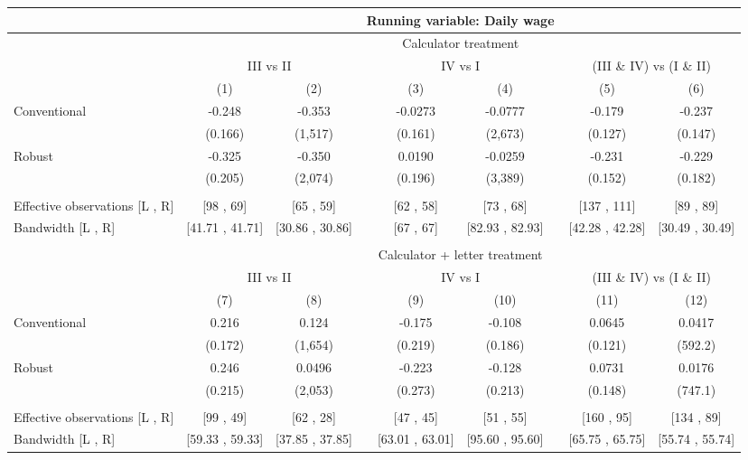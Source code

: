 \begin{tabular}{lcccccccc}
\toprule
      & \multicolumn{8}{c}{Running variable: Daily wage} \\
\midrule
      & \multicolumn{8}{c}{Calculator treatment} \\
\midrule
      & \multicolumn{2}{c}{III vs II} &       & \multicolumn{2}{c}{IV vs I} &       & \multicolumn{2}{c}{(III \& IV) vs (I \& II)} \\
\cmidrule{2-3}\cmidrule{5-6}\cmidrule{8-9}      & (1)   & (2)   &       & (3)   & (4)   &       & (5)   & (6) \\
\midrule
\midrule
Conventional & -0.248 & -0.353 &       & -0.0273 & -0.0777 &       & -0.179 & -0.237 \\
      & (0.166) & (1,517) &       & (0.161) & (2,673) &       & (0.127) & (0.147) \\
Robust & -0.325 & -0.350 &       & 0.0190 & -0.0259 &       & -0.231 & -0.229 \\
      & (0.205) & (2,074) &       & (0.196) & (3,389) &       & (0.152) & (0.182) \\
      &       &       &       &       &       &       &       &  \\
\midrule
Effective observations [L , R] & [98 ,  69] & [65 ,  59] &       & [62 ,  58] & [73 ,  68] &       & [137 ,  111] & [89 ,  89] \\
Bandwidth [L , R] & [41.71 ,  41.71] & [30.86 ,  30.86] &       & [67 ,  67] & [82.93 ,  82.93] &       & [42.28 ,  42.28] & [30.49 ,  30.49] \\
\midrule
\midrule
      &       &       &       &       &       &       &       &  \\
\midrule
      & \multicolumn{8}{c}{Calculator + letter treatment} \\
\midrule
      & \multicolumn{2}{c}{III vs II} &       & \multicolumn{2}{c}{IV vs I} &       & \multicolumn{2}{c}{(III \& IV) vs (I \& II)} \\
\cmidrule{2-3}\cmidrule{5-6}\cmidrule{8-9}      & (7)   & (8)   &       & (9)   & (10)  &       & (11)  & (12) \\
\midrule
\midrule
Conventional & 0.216 & 0.124 &       & -0.175 & -0.108 &       & 0.0645 & 0.0417 \\
      & (0.172) & (1,654) &       & (0.219) & (0.186) &       & (0.121) & (592.2) \\
Robust & 0.246 & 0.0496 &       & -0.223 & -0.128 &       & 0.0731 & 0.0176 \\
      & (0.215) & (2,053) &       & (0.273) & (0.213) &       & (0.148) & (747.1) \\
      &       &       &       &       &       &       &       &  \\
\midrule
Effective observations [L , R] & [99 ,  49] & [62 ,  28] &       & [47 ,  45] & [51 ,  55] &       & [160 ,  95] & [134 ,  89] \\
Bandwidth [L , R] & [59.33 ,  59.33] & [37.85 ,  37.85] &       & [63.01 ,  63.01] & [95.60 ,  95.60] &       & [65.75 ,  65.75] & [55.74 ,  55.74] \\
\bottomrule
\bottomrule
\end{tabular}%
